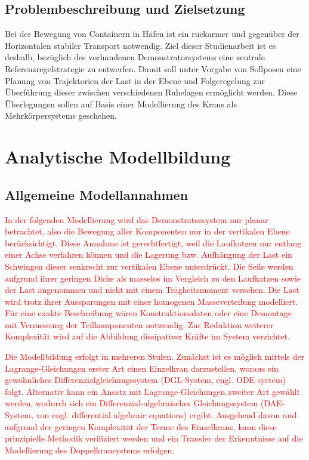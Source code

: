 \section{Problembeschreibung und Zielsetzung}
Bei der Bewegung von Containern in Häfen ist ein ruckarmer und gegenüber der Horizontalen stabiler Transport notwendig. Ziel dieser Studienarbeit ist es deshalb,  bezüglich des vorhandenen Demonstratorsystems eine zentrale Referenzregelstrategie zu entwerfen. Damit soll unter Vorgabe von Sollposen eine Planung von Trajektorien der Last in der Ebene und Folgeregelung zur Überführung dieser zwischen verschiedenen Ruhelagen ermöglicht werden. Diese Überlegungen sollen auf Basis einer Modellierung des Krans als Mehrkörpersystems geschehen. 

\chapter{Analytische Modellbildung}

\section{Allgemeine Modellannahmen}

\textcolor{red}{In der folgenden Modellierung wird das Demonstratorsystem nur planar betrachtet, also die Bewegung aller Komponenten nur in der vertikalen Ebene berücksichtigt. Diese Annahme ist gerechtfertigt, weil die Laufkatzen nur entlang einer Achse verfahren können und die Lagerung bzw. Aufhängung der Last ein Schwingen dieser senkrecht zur vertikalen Ebene unterdrückt. Die Seile werden aufgrund ihrer geringen Dicke als masselos im Vergleich zu den Laufkatzen sowie der Last angenommen und nicht mit einem Trägheitsmoment versehen. Die Last wird trotz ihrer Aussparungen mit einer homogenen Masseverteilung modelliert. Für eine exakte Beschreibung wären Konstruktionsdaten oder eine Demontage mit Vermessung der Teilkomponenten notwendig. Zur Reduktion weiterer Komplexität wird auf die Abbildung dissipativer Kräfte im System verzichtet.}

\textcolor{red}{Die Modellbildung erfolgt in mehreren Stufen. Zunächst ist es möglich mittels der Lagrange-Gleichungen erster Art einen Einzelkran darzustellen, woraus ein gewöhnliches Differenzialgleichungssystem (DGL-System, engl. ODE system) folgt. Alternativ kann ein Ansatz mit Lagrange-Gleichungen zweiter Art gewählt werden, wodurch sich ein Differenzial-algebraisches Gleichungssystem (DAE-System, von engl. differential algebraic equations) ergibt. Ausgehend davon und aufgrund der geringen Komplexität der Terme des Einzelkrans, kann diese prinzipielle Methodik verifiziert werden und ein Transfer der Erkenntnisse auf die Modellierung des Doppelkransystems erfolgen.}


